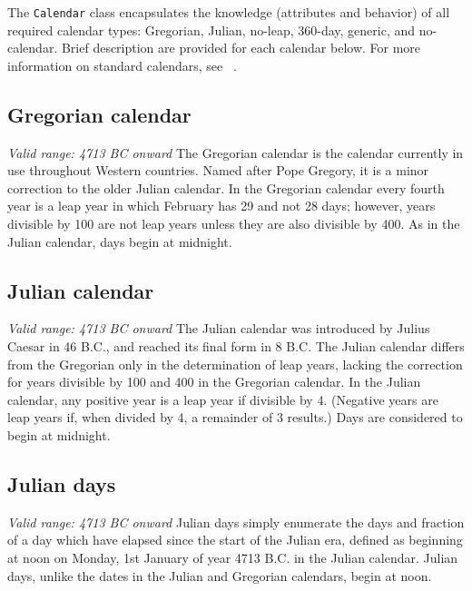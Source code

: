 
\label{sec:Calendar}
The {\tt Calendar} class encapsulates the knowledge (attributes and
behavior) of all required calendar types:  Gregorian, Julian, no-leap,
360-day, generic, and no-calendar.  Brief description are provided for
each calendar below.  For more information on standard calendars, see
~\cite{seidelman}.
            
\subsection{Gregorian calendar}
{\it Valid range: 4713 BC onward} \newline
The Gregorian calendar is the calendar currently in use throughout Western
countries.  Named after Pope Gregory, it is a minor 
correction to the older Julian calendar. In the Gregorian calendar every
fourth year is a leap year in which February has 29 and not 28 days;
however, years divisible by 100 are not leap years unless they are also 
divisible  by 400.  As in the Julian calendar, days begin at midnight.

\subsection{Julian calendar} 
{\it Valid range: 4713 BC onward} \newline
The Julian calendar was introduced by Julius Caesar in 46 B.C., and 
reached its final form in 8 B.C.  The Julian calendar differs from the 
Gregorian only in the determination of leap years, lacking the correction 
for years divisible
by 100 and 400 in the Gregorian calendar. In the Julian calendar, any positive 
year is a leap year if divisible by 4. (Negative years are leap years if, when 
divided by 4, a remainder of 3 results.) Days are considered to begin at 
midnight.

\subsection{Julian days}
{\it Valid range: 4713 BC onward} \newline
Julian days simply enumerate the days and fraction of a day which have elapsed 
since the start of the Julian era, defined as beginning at noon on Monday, 
1st January of year 4713 B.C. in the Julian calendar.  Julian days, 
unlike the dates in the Julian and Gregorian calendars, begin at noon.

